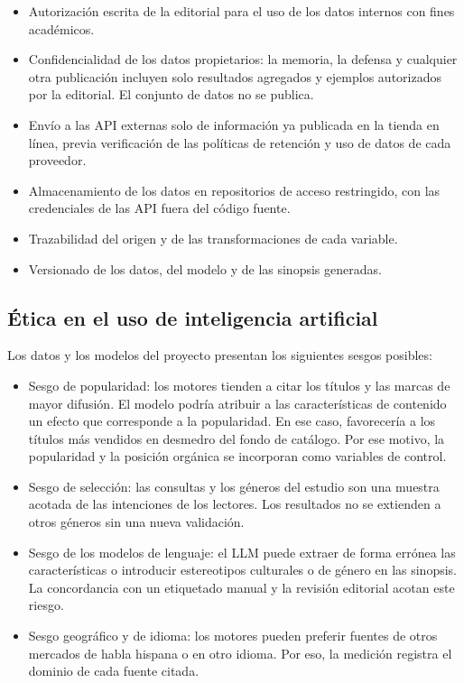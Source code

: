 \documentclass[
11pt, %
codirector, %
]{charter}
\begin{document}
\begin{itemize}
	\item Autorización escrita de la editorial para el uso de los datos internos con fines académicos.
	\item Confidencialidad de los datos propietarios: la memoria, la defensa y cualquier otra publicación incluyen solo resultados agregados y ejemplos autorizados por la editorial. El conjunto de datos no se publica.
	\item Envío a las API externas solo de información ya publicada en la tienda en línea, previa verificación de las políticas de retención y uso de datos de cada proveedor.
	\item Almacenamiento de los datos en repositorios de acceso restringido, con las credenciales de las API fuera del código fuente.
	\item Trazabilidad del origen y de las transformaciones de cada variable.
	\item Versionado de los datos, del modelo y de las sinopsis generadas.
\end{itemize}

\subsection{Ética en el uso de inteligencia artificial}

Los datos y los modelos del proyecto presentan los siguientes sesgos posibles:

\begin{itemize}
	\item Sesgo de popularidad: los motores tienden a citar los títulos y las marcas de mayor difusión. El modelo podría atribuir a las características de contenido un efecto que corresponde a la popularidad. En ese caso, favorecería a los títulos más vendidos en desmedro del fondo de catálogo. Por ese motivo, la popularidad y la posición orgánica se incorporan como variables de control.
	\item Sesgo de selección: las consultas y los géneros del estudio son una muestra acotada de las intenciones de los lectores. Los resultados no se extienden a otros géneros sin una nueva validación.
	\item Sesgo de los modelos de lenguaje: el LLM puede extraer de forma errónea las características o introducir estereotipos culturales o de género en las sinopsis. La concordancia con un etiquetado manual y la revisión editorial acotan este riesgo.
	\item Sesgo geográfico y de idioma: los motores pueden preferir fuentes de otros mercados de habla hispana o en otro idioma. Por eso, la medición registra el dominio de cada fuente citada.
\end{itemize}
\end{document}
